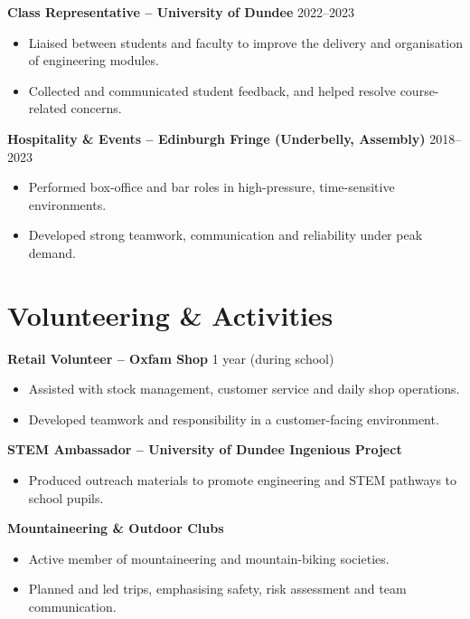 \documentclass[a4paper,11pt]{article}
\begin{document}
\textbf{Class Representative – University of Dundee} \hfill 2022--2023
\begin{itemize}
    \item Liaised between students and faculty to improve the delivery and organisation of engineering modules.
    \item Collected and communicated student feedback, and helped resolve course-related concerns.
\end{itemize}

\textbf{Hospitality \& Events – Edinburgh Fringe (Underbelly, Assembly)} \hfill 2018--2023
\begin{itemize}
    \item Performed box-office and bar roles in high-pressure, time-sensitive environments.
    \item Developed strong teamwork, communication and reliability under peak demand.
\end{itemize}


\section*{Volunteering \& Activities}

\textbf{Retail Volunteer – Oxfam Shop} \hfill 1 year (during school)
\begin{itemize}
    \item Assisted with stock management, customer service and daily shop operations.
    \item Developed teamwork and responsibility in a customer-facing environment.
\end{itemize}

\textbf{STEM Ambassador – University of Dundee Ingenious Project}
\begin{itemize}
    \item Produced outreach materials to promote engineering and STEM pathways to school pupils.
\end{itemize}

\textbf{Mountaineering \& Outdoor Clubs}
\begin{itemize}
    \item Active member of mountaineering and mountain-biking societies.
    \item Planned and led trips, emphasising safety, risk assessment and team communication.
\end{itemize}
\end{document}
